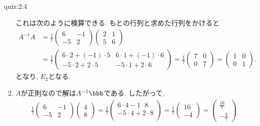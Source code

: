 \begin{answerof}{quiz:2:4}
\begin{enumerate}
  
  これは次のように検算できる.
  もとの行列と求めた行列をかけると
  \begin{align*}
    A^{-1}A
     &=
     \frac{1}{7}
     \begin{pmatrix}
      6&-1\\-5&2
    \end{pmatrix}
    \begin{pmatrix}
      2&1\\5&6
    \end{pmatrix}\\
    &=
    \frac{1}{7}
     \begin{pmatrix}
       6\cdot 2+(-1)\cdot 5&6\cdot 1+(-1)\cdot 6\\
       -5\cdot 2+2\cdot 5&-5\cdot 1+2\cdot 6
    \end{pmatrix}
    =
    \frac{1}{7}
     \begin{pmatrix}
       7&0\\
       0&7
    \end{pmatrix}
    =
     \begin{pmatrix}
       1&0\\
       0&1
    \end{pmatrix}.
  \end{align*}
  となり, $E_2$となる.

\item
  $A$が正則なので解は$A^{-1}\bbb$である.
  したがって,
  \begin{align*}
    \frac{1}{7}\begin{pmatrix}
      6&-1\\-5&2
    \end{pmatrix}
    \begin{pmatrix}
      4\\8
    \end{pmatrix}
    =
    \frac{1}{7}\begin{pmatrix}
      6\cdot 4 -1\cdot 8\\
      -5\cdot 4 +2\cdot 8\\
    \end{pmatrix}
    =
    \frac{1}{7}\begin{pmatrix}
      16\\-4
    \end{pmatrix}
    =
    \begin{pmatrix}
      \frac{16}{7}\\-\frac{4}{7}
    \end{pmatrix}
  \end{align*}


\end{enumerate}
\end{answerof}
